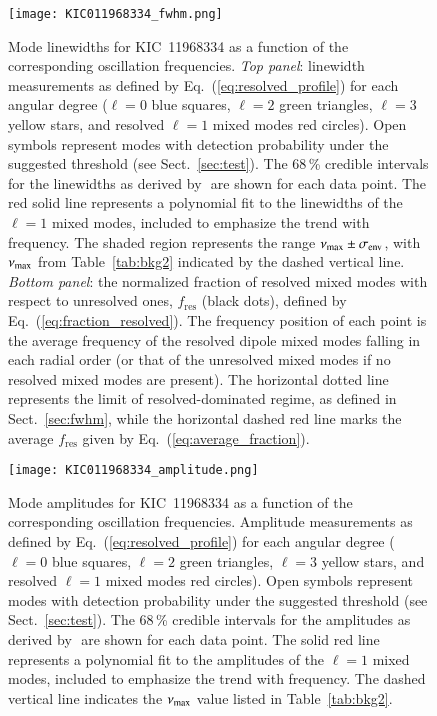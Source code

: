 \begin{figure}
   \centering
   \texttt{[image: KIC011968334\_fwhm.png]}
      \caption{Mode linewidths for KIC~11968334 as a function of the corresponding oscillation frequencies. \textit{Top panel}: linewidth measurements as defined by Eq.~(\ref{eq:resolved_profile}) for each angular degree ($\ell = 0$ blue squares, $\ell = 2$ green triangles, $\ell = 3$ yellow stars, and resolved $\ell = 1$ mixed modes red circles). Open symbols represent modes with detection probability under the suggested threshold (see Sect.~\ref{sec:test}). The 68\,\% credible intervals for the linewidths as derived by \diamonds\,\,are shown for each data point. The red solid line represents a polynomial fit to the linewidths of the $\ell = 1$ mixed modes, included to emphasize the trend with frequency. The shaded region represents the range $\nu_\mathrm{max} \pm \sigma_\mathrm{env}$, with $\nu_\mathrm{max}$ from Table~\ref{tab:bkg2} indicated by the dashed vertical line. \textit{Bottom panel}: the normalized fraction of resolved mixed modes with respect to unresolved ones, $f_\mathrm{res}$ (black dots), defined by Eq.~(\ref{eq:fraction_resolved}). The frequency position of each point is the average frequency of the resolved dipole mixed modes falling in each radial order (or that of the unresolved mixed modes if no resolved mixed modes are present). The horizontal dotted line represents the limit of resolved-dominated regime, as defined in Sect.~\ref{sec:fwhm}, while the horizontal dashed red line marks the average $f_\mathrm{res}$ given by Eq.~(\ref{eq:average_fraction}).}
    \label{fig:11968334fwhm}
\end{figure}

\begin{figure}
   \centering
   \texttt{[image: KIC011968334\_amplitude.png]}
      \caption{Mode amplitudes for KIC~11968334 as a function of the corresponding oscillation frequencies. Amplitude measurements as defined by Eq.~(\ref{eq:resolved_profile}) for each angular degree ($\ell = 0$ blue squares, $\ell = 2$ green triangles, $\ell = 3$ yellow stars, and resolved $\ell = 1$ mixed modes red circles). Open symbols represent modes with detection probability under the suggested threshold (see Sect.~\ref{sec:test}). The 68\,\% credible intervals for the amplitudes as derived by \diamonds\,\,are shown for each data point. The solid red line represents a polynomial fit to the amplitudes of the $\ell = 1$ mixed modes, included to emphasize the trend with frequency. The dashed vertical line indicates the $\nu_\mathrm{max}$ value listed in Table~\ref{tab:bkg2}.}
    \label{fig:11968334amplitude}
\end{figure}
\clearpage